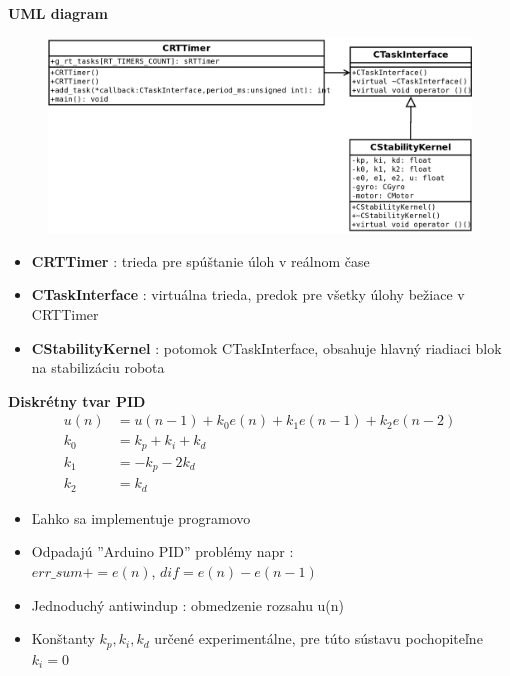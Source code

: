 \documentclass[xcolor=dvipsnames]{beamer}
\begin{document}
\begin{frame}{\bf UML diagram}



      \begin{figure}[ht]
      \begin{center}
      \begin{minipage}{0.8\linewidth}
      \begin{center}
      \includegraphics[width=1.0\textwidth]{robot_pid_gyro.png}
      \end{center}
      \end{minipage}
      \end{center}
      \end{figure}



  \begin{itemize}
    \item {\bf CRTTimer} : trieda pre spúštanie úloh v reálnom čase
    \item {\bf CTaskInterface} : virtuálna trieda, predok pre všetky úlohy bežiace v CRTTimer
    \item {\bf CStabilityKernel} : potomok CTaskInterface, obsahuje hlavný riadiaci blok na stabilizáciu robota
  \end{itemize}



\end{frame}

\begin{frame}{\bf Diskrétny tvar PID}
  \begin{align*}
    u(n) &= u(n-1) + k_0e(n) +  k_1e(n-1) +  k_2e(n-2) \\
    k_0 &= k_p + k_i + k_d \\
    k_1 &= -k_p     - 2k_d \\
    k_2 &=         k_d
  \end{align*}

  \begin{itemize}
    \item Ľahko sa implementuje programovo
    \item Odpadajú ''Arduino PID'' problémy napr : \\ $err\_sum+= e(n)$, $dif = e(n) - e(n-1)$
    \item Jednoduchý antiwindup : obmedzenie rozsahu u(n)
    \item Konštanty $k_p, k_i, k_d$ určené experimentálne, pre túto sústavu pochopiteľne $k_i = 0$
  \end{itemize}
\end{frame}
\end{document}

